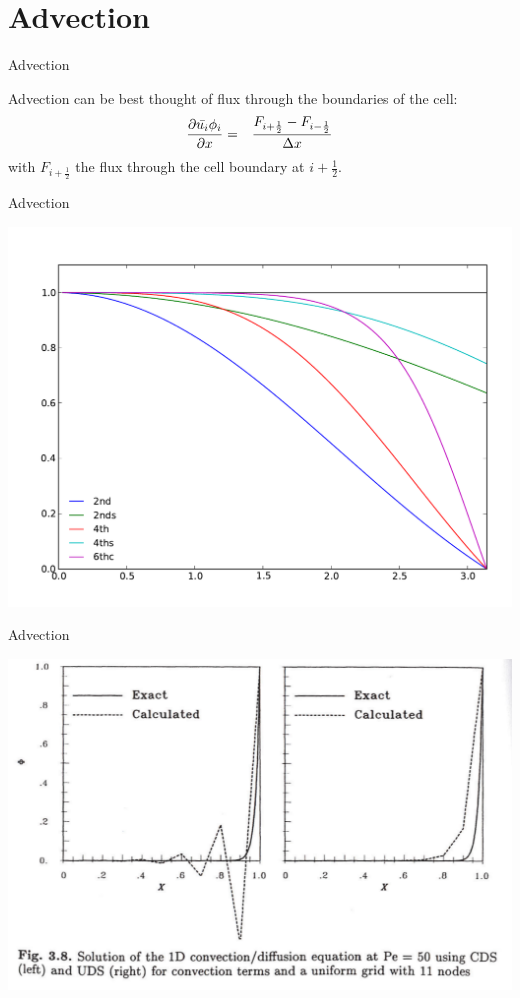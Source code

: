 \section[Advection]{Advection}
\begin{frame}{Advection}

Advection can be best thought of flux through the boundaries of the cell:
\begin{align*}
 \frac{\partial \bar{u_i}\phi_i}{\partial x} &=& \frac{F_{i+\frac{1}{2}}-F_{i-\frac{1}{2}}}{\Delta x}
\end{align*}
 with $F_{i+\frac{1}{2}}$ the flux through the cell boundary at ${i+\frac{1}{2}}$.


\end{frame}
\begin{frame}{Advection}
\begin{center}
\includegraphics[height=0.7\textheight]{modkratio.pdf}       
\end{center}

\end{frame}
\begin{frame}{Advection}
\begin{center}
\includegraphics[height=0.7\textheight]{wiggles.png}       
\end{center}

\end{frame}

